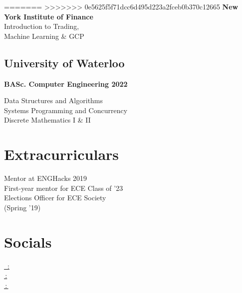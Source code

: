 \documentclass[]{deedy-resume-openfont}
\begin{document}
\begin{minipage}[t]{0.33\textwidth}
=======
>>>>>>> 0e5625f5f71dcc6d495d223a2fceb0b370c12665
\textbf{New York Institute of Finance} \\
\textbullet{} Introduction to Trading,  \\
\hspace{0.65em} Machine Learning \& GCP 
\sectionsep
\subsection{University of Waterloo}
\textbf{BASc. Computer Engineering 2022}

\textbullet{} Data Structures and Algorithms \\
\textbullet{} Systems Programming and Concurrency \\
\textbullet{} Discrete Mathematics I \& II \\



\sectionsep


\section{Extracurriculars} 
\textbullet{} Mentor at ENGHacks 2019 \\
\textbullet{} First-year mentor for ECE Class of '23 \\
\textbullet{} Elections Officer for ECE Society \\ 
\hspace{0.7em}(Spring '19) 

\sectionsep


\section{Socials}
\href{https://www.linkedin.com/in/mhabaig/}{\faLinkedinSquare \, : } \\
\href{https://github.com/baighamza}{\faGithubSquare \,: } \\
\href{http://www.hamzais.me/}{\faGlobe\,:\,}




%
%

\end{minipage} 
\hfill
\end{document}
